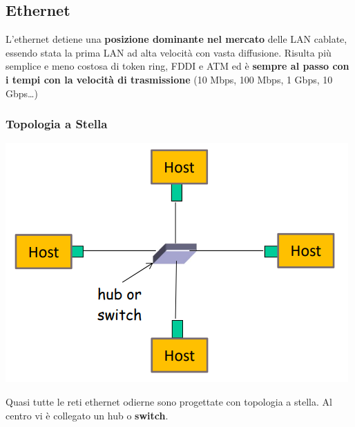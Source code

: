 \documentclass[10pt]{article}
\begin{document}
\subsection{Ethernet}
L'ethernet detiene una \textbf{posizione dominante nel mercato} delle LAN cablate, essendo stata la prima LAN ad alta velocità con vasta diffusione. Risulta più semplice e meno costosa di token ring, FDDI e ATM ed è \textbf{sempre al passo con i tempi con la velocità di trasmissione} (10 Mbps, 100 Mbps, 1 Gbps, 10 Gbps\ldots)
\subsubsection{Topologia a Stella}
\begin{center}
	\includegraphics[scale=0.7]{topologia_stella.png}
\end{center}
Quasi tutte le reti ethernet odierne sono progettate con topologia a stella. Al centro vi è collegato un hub o \textbf{switch}.
\end{document}
